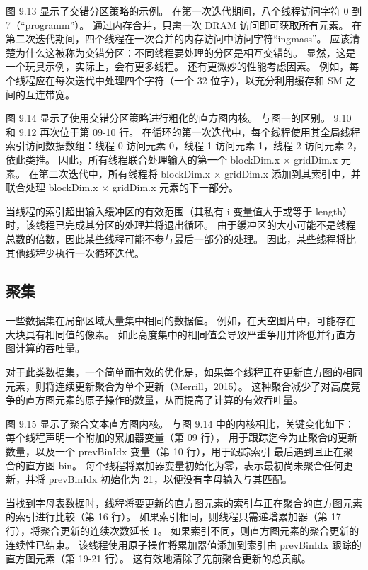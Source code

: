 图 9.13 显示了交错分区策略的示例。 在第一次迭代期间，八个线程访问字符 0 到 7（“programm”）。 
通过内存合并，只需一次 DRAM 访问即可获取所有元素。 在第二次迭代期间，四个线程在一次合并的内存访问中访问字符“ingmass”。 
应该清楚为什么这被称为交错分区：不同线程要处理的分区是相互交错的。 显然，这是一个玩具示例，实际上，会有更多线程。 
还有更微妙的性能考虑因素。 例如，每个线程应在每次迭代中处理四个字符（一个 32 位字），以充分利用缓存和 SM 之间的互连带宽。

图 9.14 显示了使用交错分区策略进行粗化的直方图内核。 与图一的区别。 9.10 和 9.12 再次位于第 09-10 行。 
在循环的第一次迭代中，每个线程使用其全局线程索引访问数据数组：线程 0 访问元素 0，线程 1 访问元素 1，线程 2 访问元素 2，
依此类推。 因此，所有线程联合处理输入的第一个 blockDim.x × gridDim.x 元素。 
在第二次迭代中，所有线程将 blockDim.x × gridDim.x 添加到其索引中，并联合处理 blockDim.x × gridDim.x 元素的下一部分。

当线程的索引超出输入缓冲区的有效范围（其私有 i 变量值大于或等于 length）时，该线程已完成其分区的处理并将退出循环。 
由于缓冲区的大小可能不是线程总数的倍数，因此某些线程可能不参与最后一部分的处理。 
因此，某些线程将比其他线程少执行一次循环迭代。

\subsection{聚集}
一些数据集在局部区域大量集中相同的数据值。 例如，在天空图片中，可能存在大块具有相同值的像素。 
如此高度集中的相同值会导致严重争用并降低并行直方图计算的吞吐量。

对于此类数据集，一个简单而有效的优化是，如果每个线程正在更新直方图的相同元素，则将连续更新聚合为单个更新（Merrill，2015）。 
这种聚合减少了对高度竞争的直方图元素的原子操作的数量，从而提高了计算的有效吞吐量。

图 9.15 显示了聚合文本直方图内核。 与图 9.14 中的内核相比，关键变化如下：每个线程声明一个附加的累加器变量（第 09 行），
用于跟踪迄今为止聚合的更新数量，以及一个 prevBinIdx 变量（第 10 行），用于跟踪索引 最后遇到且正在聚合的直方图 bin。 
每个线程将累加器变量初始化为零，表示最初尚未聚合任何更新，并将 prevBinIdx 初始化为 21，以便没有字母输入与其匹配。

当找到字母表数据时，线程将要更新的直方图元素的索引与正在聚合的直方图元素的索引进行比较（第 16 行）。 
如果索引相同，则线程只需递增累加器（第 17 行），将聚合更新的连续次数延长 1。 
如果索引不同，则直方图元素的聚合更新的连续性已结束。 
该线程使用原子操作将累加器值添加到索引由 prevBinIdx 跟踪的直方图元素（第 19-21 行）。 这有效地清除了先前聚合更新的总贡献。

